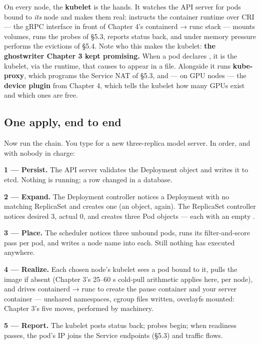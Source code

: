 On every node, the \textbf{kubelet} is the hands. It watches the API server for pods bound to \textit{its} node and makes them real: instructs the container runtime over CRI — the gRPC interface in front of Chapter 4's containerd → runc stack — mounts volumes, runs the probes of §5.3, reports status back, and under memory pressure performs the evictions of §5.4. Note who this makes the kubelet: \textbf{the ghostwriter Chapter 3 kept promising.} When a pod declares , it is the kubelet, via the runtime, that causes  to appear in a  file. Alongside it runs \textbf{kube-proxy}, which programs the Service NAT of §5.3, and — on GPU nodes — the \textbf{device plugin} from Chapter 4, which tells the kubelet how many GPUs exist and which ones are free.

\subsection*{One apply, end to end}

Now run the chain. You type  for a new three-replica model server. In order, and with nobody in charge:

\begin{tbbitemize}
  \item \textbf{1 — Persist.} The API server validates the Deployment object and writes it to etcd. Nothing is running; a row changed in a database.
  \item \textbf{2 — Expand.} The Deployment controller notices a Deployment with no matching ReplicaSet and creates one (an object, again). The ReplicaSet controller notices desired 3, actual 0, and creates three Pod objects — each with an empty .
  \item \textbf{3 — Place.} The scheduler notices three unbound pods, runs its filter-and-score pass per pod, and writes a node name into each. Still nothing has executed anywhere.
  \item \textbf{4 — Realize.} Each chosen node's kubelet sees a pod bound to it, pulls the image if absent (Chapter 3's 25–60 s cold-pull arithmetic applies here, per node), and drives containerd → runc to create the pause container and your server container — unshared namespaces, cgroup files written, overlayfs mounted: Chapter 3's five moves, performed by machinery.
  \item \textbf{5 — Report.} The kubelet posts status back; probes begin; when readiness passes, the pod's IP joins the Service endpoints (§5.3) and traffic flows.
\end{tbbitemize}

